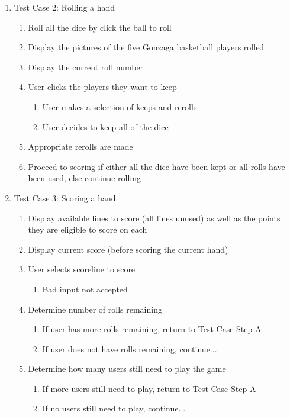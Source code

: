 \documentclass[]{report}   %
\begin{document}
\begin{enumerate}
	\item Test Case 2: Rolling a hand
		\begin{enumerate}
		\item Roll all the dice by click the ball to roll
		\item Display the pictures of the five Gonzaga basketball players rolled
		\item Display the current roll number
		\item User clicks the players they want to keep
			\begin{enumerate}
			\item User makes a selection of keeps and rerolls
			\item User decides to keep all of the dice
			\end{enumerate}
		\item Appropriate rerolls are made
		\item Proceed to scoring if either all the dice have been kept or all rolls have been used, else continue rolling
		\end{enumerate}
	\item Test Case 3: Scoring a hand
		\begin{enumerate}
		\item Display available lines to score (all lines unused) as well as the points they are eligible to score on each
		\item Display current score (before scoring the current hand) 
		\item User selects scoreline to score
			\begin{enumerate}
			\item Bad input not accepted
			\end{enumerate}
		\item Determine number of rolls remaining
			\begin{enumerate}
			\item If user has more rolls remaining, return to Test Case Step A
			\item If user does not have rolls remaining, continue...
			\end{enumerate}
		\item Determine how many users still need to play the game
			\begin{enumerate}
			\item If more users still need to play, return to Test Case Step A
			\item If no users still need to play, continue...
			\end{enumerate}

\end{enumerate}
\end{enumerate}
\end{document}
